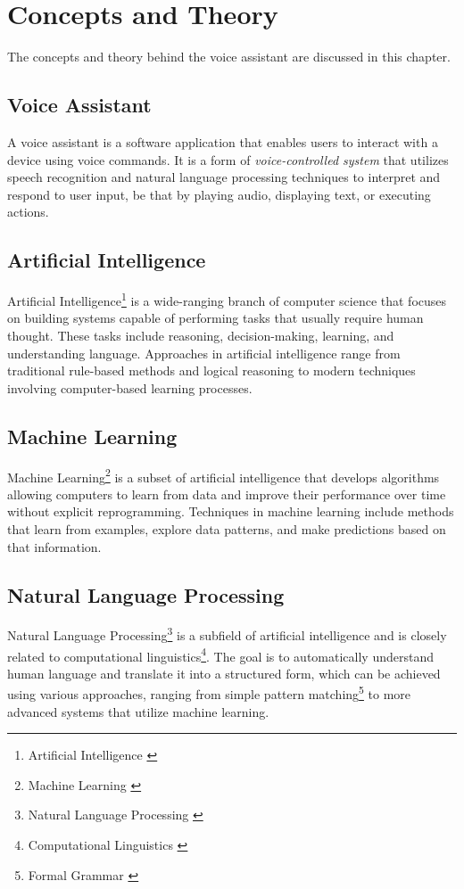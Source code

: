 \cleardoubleemptypage
\renewcommand*\chapterpagestyle{scrheadings}

\chapter{Concepts and Theory}
The concepts and theory behind the voice assistant are discussed in this chapter.

\section{Voice Assistant}
A voice assistant is a software application that enables users  
to interact with a device using voice commands.  
It is a form of \textit{voice-controlled system} that utilizes speech recognition  
and natural language processing techniques to interpret and respond  
to user input,  
be that by playing audio, displaying text, or executing actions.

\section{Artificial Intelligence}
Artificial Intelligence\footnote{Artificial Intelligence \cite{ai}} is a wide-ranging branch  
of computer science that focuses on building systems capable of performing  
tasks that usually require human thought.  
These tasks include reasoning, decision-making, learning, and understanding  
language. Approaches in artificial intelligence range from traditional rule-based methods  
and logical reasoning to modern techniques involving computer-based learning processes.

\section{Machine Learning}
Machine Learning\footnote{Machine Learning \cite{ml}} is a subset of artificial intelligence  
that develops algorithms allowing computers to learn from data and improve  
their performance over time without explicit reprogramming.  
Techniques in machine learning include methods that learn from examples,  
explore data patterns, and make predictions based on that information.

\section{Natural Language Processing}
Natural Language Processing\footnote{Natural Language Processing \cite{nlp}} is a subfield of artificial intelligence  
and is closely related to computational linguistics\footnote{Computational Linguistics \cite{cl}}.  
The goal is to automatically understand human language and translate it into  
a structured form, which can be achieved using various approaches,  
ranging from simple pattern matching\footnote{Formal Grammar \cite{pm}}  
to more advanced systems that utilize machine learning.

